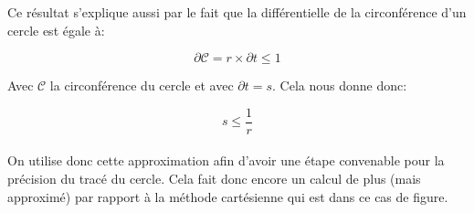 \documentclass{report}
\begin{document}
Ce résultat s'explique aussi par le fait que la différentielle de la
circonférence d'un cercle est égale à:

\begin{equation}
	\partial \mathcal{C} = r\times\partial t \leq 1
\end{equation}

Avec $\mathcal{C}$ la circonférence du cercle et avec $\partial t = s$. Cela
nous donne donc:

\begin{equation}
	s \leq \dfrac{1}{r}
\end{equation}

\paragraph{} On utilise donc cette approximation afin d'avoir une étape
convenable pour la précision du tracé du cercle. Cela fait donc encore un
calcul de plus (mais approximé) par rapport à la méthode cartésienne qui est
dans ce cas de figure.
\end{document}
